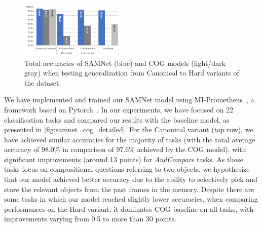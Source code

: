 \begin{figure}
	\centering
	\includegraphics[width=0.45\textwidth]{../results/samnet_cog_overall_transfer.png}
	\caption{Total accuracies of SAMNet (blue) and COG models (light/dark gray) when testing generalization from Canonical to Hard variants of the dataset.}
	\label{fig:samnet_cog_overall_transfer}
\end{figure}

We have implemented and trained our SAMNet model using MI-Prometheus~\cite{kornuta2018accelerating}, a framework based on Pytorch~\cite{paszke2017automatic}. 
In our experiments, we have focused on 22 classification tasks and compared our results with the baseline model, as presented in \cref{fig:samnet_cog_detailed}.
For the Canonical variant (top row), we have achieved similar accuracies for the majority of tasks (with the total average accuracy of 98.0\% in comparison of 97.6\% achieved by the COG model), with significant improvements (around 13 points) for \textit{AndCompare} tasks.
As those tasks focus on compositional questions referring to two objects, we hypothesize that our model achieved better accuracy due to the ability to selectively pick and store the relevant objects from the past frames in the memory.
Despite there are some tasks in which our model reached slightly lower accuracies,
when comparing performances on the Hard variant, it dominates COG baseline on all tasks, with improvements varying from 0.5 to more than 30 points.

